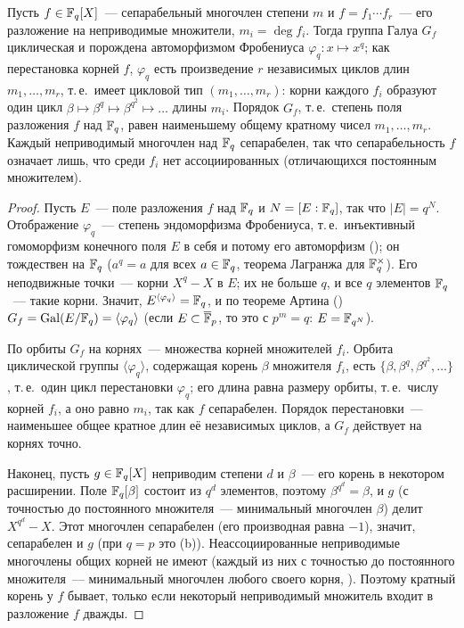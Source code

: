 \begin{proposition}[4.25a]
Пусть $f\in\mathbb F_q[X]$~--- сепарабельный многочлен степени $m$ и $f=f_1\cdots f_r$~--- его разложение на неприводимые
множители, $m_i=\deg f_i$. Тогда группа Галуа $G_f$ циклическая и порождена автоморфизмом Фробениуса $\varphi_q\colon x\mapsto x^q$;
как перестановка корней $f$, $\varphi_q$ есть произведение $r$ независимых циклов длин $m_1,\dots,m_r$, т.\,е.\ имеет
цикловой тип $(m_1,\dots,m_r)$: корни каждого $f_i$ образуют один цикл $\beta\mapsto\beta^q\mapsto\beta^{q^2}\mapsto\dots$ длины $m_i$.
Порядок $G_f$, т.\,е.\ степень поля разложения $f$ над $\mathbb F_q$, равен наименьшему общему кратному чисел $m_1,\dots,m_r$.
Каждый неприводимый многочлен над $\mathbb F_q$ сепарабелен, так что сепарабельность $f$ означает лишь, что среди $f_i$ нет
ассоциированных \textup(отличающихся постоянным множителем\textup).
\end{proposition}

\begin{proof}
Пусть $E$~--- поле разложения $f$ над $\mathbb F_q$ и $N=[E:\mathbb F_q]$, так что $|E|=q^N$. Отображение $\varphi_q$~--- степень
эндоморфизма Фробениуса, т.\,е.\ инъективный гомоморфизм конечного поля $E$ в себя и потому его автоморфизм ();
он тождествен на $\mathbb F_q$ ($a^q=a$ для всех $a\in\mathbb F_q$, теорема Лагранжа для $\mathbb F_q^\times$). Его неподвижные точки~--- корни
$X^q-X$ в $E$; их не больше $q$, и все $q$ элементов $\mathbb F_q$~--- такие корни. Значит, $E^{\langle\varphi_q\rangle}=\mathbb F_q$, и по
теореме Артина () $G_f=\operatorname{Gal}(E/\mathbb F_q)=\langle\varphi_q\rangle$ (если $E\subset\overline{\mathbb F}_p$, то это  с $p^m=q$: $E=\mathbb F_{q^N}$).

По  орбиты $G_f$ на корнях~--- множества корней множителей $f_i$. Орбита циклической группы $\langle\varphi_q\rangle$,
содержащая корень $\beta$ множителя $f_i$, есть $\{\beta,\beta^q,\beta^{q^2},\dots\}$, т.\,е.\ один цикл перестановки $\varphi_q$; его
длина равна размеру орбиты, т.\,е.\ числу корней $f_i$, а оно равно $m_i$, так как $f$ сепарабелен. Порядок
перестановки~--- наименьшее общее кратное длин её независимых циклов, а $G_f$ действует на корнях точно.

Наконец, пусть $g\in\mathbb F_q[X]$ неприводим степени $d$ и $\beta$~--- его корень в некотором расширении. Поле $\mathbb F_q[\beta]$ состоит
из $q^d$ элементов, поэтому $\beta^{q^d}=\beta$, и $g$ (с точностью до постоянного множителя~--- минимальный многочлен $\beta$)
делит $X^{q^d}-X$. Этот многочлен сепарабелен (его производная равна $-1$), значит, сепарабелен и $g$ (при $q=p$ это
(b)). Неассоциированные неприводимые многочлены общих корней не имеют (каждый из них с точностью до постоянного
множителя~--- минимальный многочлен любого своего корня, ). Поэтому кратный корень у $f$ бывает, только если
некоторый неприводимый множитель входит в разложение $f$ дважды.
\end{proof}

